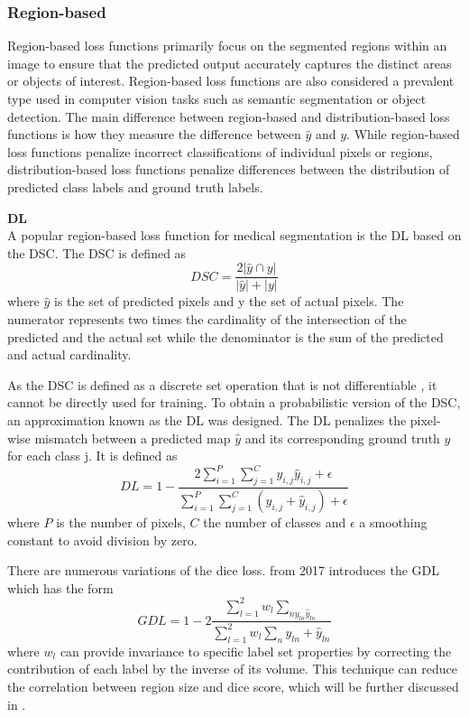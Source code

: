 \subsubsection*{Region-based}
\label{subsec:region_based}
Region-based loss functions primarily focus on the segmented regions within an image to ensure that the predicted output accurately captures the distinct areas or objects of interest. Region-based loss functions are also considered a prevalent type used in computer vision tasks such as semantic segmentation or object detection. The main difference between region-based and distribution-based loss functions is how they measure the difference between $\hat{y}$ and $y$. While region-based loss functions penalize incorrect classifications of individual pixels or regions, distribution-based loss functions penalize differences between the distribution of predicted class labels and ground truth labels.

\textbf{\acf{DL}}\\
\label{subsubsec:dice_similarity_coefficient_loss}
A popular region-based loss function for medical segmentation is the \acf{DL} based on the \ac{DSC}. The \ac{DSC} is defined as
\begin{equation}
    DSC= \frac{2|\hat{y} \cap y|}{|\hat{y}|+|y|}
    \label{eqn:dsc}
\end{equation}
where $\hat{y}$ is the set of predicted pixels and y the set of actual pixels. The numerator represents two times the cardinality of the intersection of the predicted and the actual set while the denominator is the sum of the predicted and actual cardinality.

As the \ac{DSC} is defined as a discrete set operation that is not differentiable \cite{9338261}, it cannot be directly used for training. To obtain a probabilistic version of the \ac{DSC}, an approximation known as the \ac{DL} was designed. The \ac{DL} penalizes the pixel-wise mismatch between a predicted map $\hat{y}$ and its corresponding ground truth $y$ for each class j. It is defined as
\begin{equation}
    DL=1-\frac{2\sum_{i=1}^P\sum_{j=1}^C y_{i,j} \hat{y}_{i,j}+\epsilon}{\sum_{i=1}^P\sum_{j=1}^C(y_{i,j}+\hat{y}_{i,j})+\epsilon}
\end{equation}
where $P$ is the number of pixels, $C$ the number of classes and $\epsilon$ a smoothing constant to avoid division by zero.

There are numerous variations of the dice loss. \cite{Sudre_2017} from 2017 introduces the \ac{GDL} which has the form
\begin{equation}
    GDL=1-2\frac{\sum_{l=1}^2 w_l\sum_{n y_{ln}\hat{y}_{ln}}}{\sum_{l=1}^2 w_l\sum_n y_{ln}+\hat{y}_{ln}}
    \label{eqn:gdl}
\end{equation}
where $w_l$ can provide invariance to specific label set properties by correcting the contribution of each label by the inverse of its volume. This technique can reduce the correlation between region size and dice score, which will be further discussed in .

